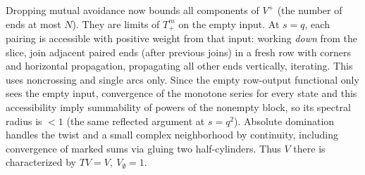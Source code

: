 \documentclass[11pt]{article}
\numberwithin{equation}{section}
\theoremstyle{definition}\newtheorem{definition}[theorem]{Definition}
\theoremstyle{remark}\newtheorem{remark}[theorem]{Remark}
\begin{document}
Dropping mutual avoidance now bounds all components of \(V^+\) (the number of ends at most \(N\)). They are limits of \(T_+^m\) on the empty input. At \(s=q\), each pairing is accessible with positive weight from that input: working \emph{down} from the slice, join adjacent paired ends (after previous joins) in a fresh row with corners and horizontal propagation, propagating all other ends vertically, iterating. This uses noncrossing and single arcs only. Since the empty row-output functional only sees the empty input, convergence of the monotone series for every state and this accessibility imply summability of powers of the nonempty block, so its spectral radius is \(<1\) (the same reflected argument at \(s=q^2\)). Absolute domination handles the twist and a small complex neighborhood by continuity, including convergence of marked sums via gluing two half-cylinders. Thus \(V\) there is characterized by \(T V=V,\ V_\emptyset=1\).
\end{document}
